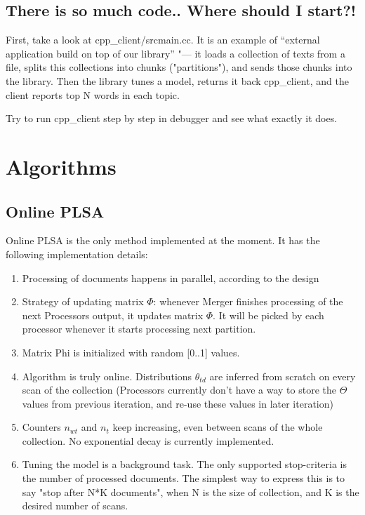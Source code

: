 \documentclass[11pt,a4paper,twoside]{report}
\begin{document}
\subsection{There is so much code.. Where should I start?!}

First, take a look at cpp\_client/srcmain.cc.
It is an example of ``external application build on top of our library'' "---
it loads a collection of texts from a file,
splits this collections into chunks ("partitions"),
and sends those chunks into the library.
Then the library tunes a model,
returns it back  cpp\_client,
and the client reports top N words in each topic.

Try to run cpp\_client step by step in debugger and see what exactly it does.

\section{Algorithms}

\subsection{Online PLSA}
Online PLSA is the only method implemented at the moment.
It has the following implementation details:
\begin{enumerate}
    \item Processing of documents happens in parallel, according to the design
    \item Strategy of updating matrix $\Phi$: whenever Merger finishes processing of the next Processors output,
    it updates matrix $\Phi$. It will be picked by each processor whenever it starts processing next partition.
    \item Matrix Phi is initialized with random [0..1] values.
    \item Algorithm is truly online. Distributions $\theta_{t d}$ are inferred from scratch on every scan of the collection (Processors currently don't have a way to store the $\Theta$ values from previous iteration,
        and re-use these values in later iteration)
    \item Counters $n_{w t}$ and $n_t$ keep increasing, even between scans of the whole collection.
    No exponential decay is currently implemented.
    \item Tuning the model is a background task. The only supported stop-criteria is the number of processed documents. The simplest way to express this is to say "stop after N*K documents", when N is the size of collection,
        and K is the desired number of scans.
\end{enumerate}
\end{document}
